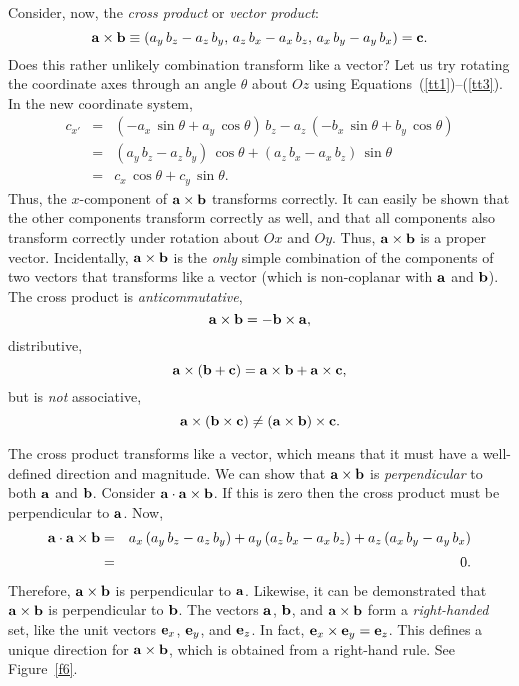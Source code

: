 Consider, now, the {\em cross product}\/ or {\em vector product}:
\begin{equation}
{\bf a}\times{\bf b} \equiv (a_y \, b_z-a_z\, b_y,\, a_z\, b_x - a_x\, b_z,\, a_x\, b_y - a_y\, b_x)
={\bf c}.
\end{equation}
Does this rather unlikely combination transform like a vector? Let us try
rotating the coordinate axes through an angle $\theta$  about $Oz$ using Equations~(\ref{tt1})--(\ref{tt3}).
In the new coordinate system,
\begin{eqnarray}
c_{x'} &= &(-a_x\, \sin\theta + a_y\,\cos\theta)\,b_z - a_z\,(-b_x\, \sin\theta + b_y\,\cos\theta)
\nonumber\\[0.5ex]
&=& (a_y\, b_z - a_z\, b_y)\, \cos\theta + (a_z\, b_x-a_x\, b_z)\,\sin\theta\nonumber\\[0.5ex]
& =& c_x\,\cos\theta
+c_y\,\sin\theta.
\end{eqnarray}
Thus, the $x$-component of ${\bf a}\times{\bf b}$ transforms correctly. It can
easily  be shown that the other components transform correctly as well, and that
all components also transform correctly under rotation about $Ox$ and $Oy$. 
Thus, ${\bf a}\times {\bf b}$ is a proper vector. Incidentally, ${\bf a}\times {\bf b}$
is the {\em only}\/ simple combination of the components of two vectors that transforms
like a vector (which is non-coplanar with ${\bf a}$ and ${\bf b}$).
 The cross product is 
{\em anticommutative},
\begin{equation}
{\bf a}\times{\bf b} = - {\bf b} \times{\bf a},
\end{equation}
distributive,
\begin{equation}
{\bf a}\times({\bf b} +{\bf c})=  {\bf a} \times{\bf b}+{\bf a}\times{\bf c},
\end{equation}
but is {\em not}\/ associative,
\begin{equation}
{\bf a}\times({\bf b} \times{\bf c})\neq ({\bf a}\times{\bf b}) \times{\bf c}.
\end{equation}

The cross product  transforms like a vector, which
means that it must have  a well-defined direction and magnitude. We can show
that ${\bf a}\times{\bf b}$ is {\em perpendicular}\/ to both ${\bf a}$ and ${\bf b}$.
Consider ${\bf a}\cdot {\bf a}\times{\bf b}$. If this is zero then the cross product
must be perpendicular to ${\bf a}$. Now,
\begin{eqnarray}
{\bf a}\cdot {\bf a}\times{\bf b} &= &a_x\,(a_y\, b_z-a_z\, b_y) + a_y\, (a_z\, b_x- a_x \,b_z)
+a_z\,(a_x \,b_y - a_y\, b_x)\nonumber\\[0.5ex]
&=& 0.
\end{eqnarray}
Therefore, ${\bf a}\times {\bf b}$ is perpendicular to ${\bf a}$. Likewise, it can
be demonstrated that ${\bf a}\times{\bf b}$ is perpendicular to ${\bf b}$. 
The vectors $\bf a$, $\bf b$, and ${\bf a}\times{\bf b}$ form a {\em right-handed}\/
set, like the unit vectors ${\bf e}_x$, ${\bf e}_y$, and ${\bf e}_z$. In fact,  ${\bf e}_x\times
{\bf e}_y={\bf e}_z$. This defines a unique direction for ${\bf a}\times{\bf b}$, which
is obtained from a right-hand rule. See Figure~\ref{f6}.

